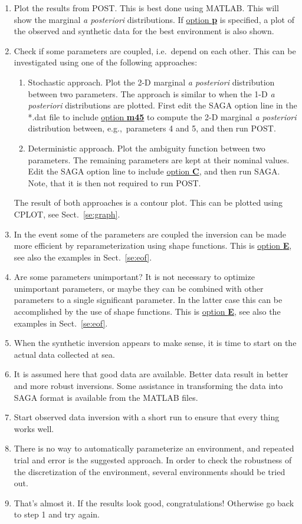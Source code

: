 \documentclass{saclantc}
\begin{document}
\begin{enumerate}
\item Plot the results from {\sf POST}. This is best done using MATLAB.
This will show the marginal {\it a posteriori } distributions.
If \underline{option {\bf p}} is specified, 
a plot of the observed  and synthetic data for the best
environment is also shown.
\item Check if some parameters are coupled, i.e.\ depend on each
other. 
This can be investigated
using one of the following approaches:
\begin{enumerate}
  \item Stochastic approach. Plot the 2-D marginal
  {\it a posteriori } distribution between two parameters. The approach
  is similar to when the 1-D {\it a posteriori } distributions are
  plotted. First edit the {\sf SAGA} option line in the *.dat file to include 
  \underline{option {\bf m45}} to compute the 2-D marginal
  {\it a posteriori } distribution between, e.g.,\ parameters 4 and 5, and then
  run {\sf POST}.
  \item Deterministic approach.
  Plot the ambiguity function between two
  parameters. The remaining parameters are kept at their nominal values.
  Edit the {\sf SAGA} option line to include 
  \underline{option {\bf C}}, and then
  run {\sf SAGA}. Note, that it is then not required to run {\sf POST}.
\end{enumerate}
The result of both  approaches is a contour plot. This can be plotted
using {\sf CPLOT}, see Sect.\ \ref{se:graph}.
\item In the event some of the parameters are coupled the
inversion can be made more efficient by reparameterization
 using shape functions. This is \underline{option {\bf
E}},  see also
the examples in Sect.\ \ref{se:eof}.
\item Are some parameters unimportant?  It is not necessary
to optimize unimportant parameters, or maybe they can be combined with other
parameters to a single significant parameter. In the latter case this
can be accomplished by the use of shape functions. 
This is \underline{option {\bf E}},  see also
the examples in Sect.\ \ref{se:eof}.
\item When the synthetic inversion appears to make sense, it is time to
start on the actual data collected at sea.
\item It is assumed here that good data are available. Better data
result in better and more robust inversions. Some assistance in
transforming the data into {\sf SAGA} format is available from the MATLAB
files.
\item Start observed data inversion with a short run to ensure that
every thing  works well.
\item There is no way to automatically parameterize an environment, 
and repeated trial and error is the suggested approach. In order to check the
robustness of the discretization of the environment, several
environments should be tried out.
\item That's almost it.
If the results look good, congratulations! Otherwise go back to step 1
and try again.
\end{enumerate}
\end{document}
